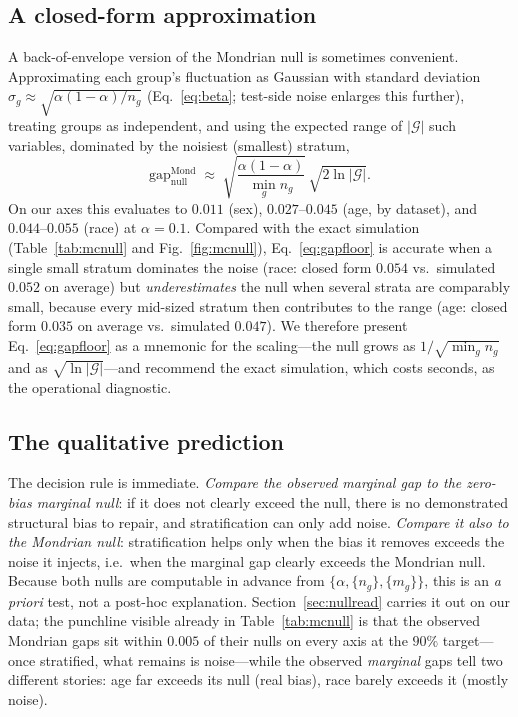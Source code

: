 \documentclass[review,12pt]{elsarticle}
\begin{document}
\subsection{A closed-form approximation}
\label{sec:floor}
A back-of-envelope version of the Mondrian null is sometimes convenient. Approximating each group's fluctuation as Gaussian with standard deviation $\sigma_g \approx \sqrt{\alpha(1-\alpha)/n_g}$ (Eq.~\eqref{eq:beta}; test-side noise enlarges this further), treating groups as independent, and using the expected range of $|\mathcal{G}|$ such variables, dominated by the noisiest (smallest) stratum,
\begin{equation}
\mathrm{gap}^{\mathrm{Mond}}_{\mathrm{null}} \;\approx\; \sqrt{\frac{\alpha(1-\alpha)}{\min_g n_g}}\,\sqrt{2\ln|\mathcal{G}|}.
\label{eq:gapfloor}
\end{equation}
On our axes this evaluates to $0.011$ (sex), $0.027$--$0.045$ (age, by dataset), and $0.044$--$0.055$ (race) at $\alpha=0.1$. Compared with the exact simulation (Table~\ref{tab:mcnull} and Fig.~\ref{fig:mcnull}), Eq.~\eqref{eq:gapfloor} is accurate when a single small stratum dominates the noise (race: closed form $0.054$ vs.\ simulated $0.052$ on average) but \emph{underestimates} the null when several strata are comparably small, because every mid-sized stratum then contributes to the range (age: closed form $0.035$ on average vs.\ simulated $0.047$). We therefore present Eq.~\eqref{eq:gapfloor} as a mnemonic for the scaling---the null grows as $1/\sqrt{\min_g n_g}$ and as $\sqrt{\ln |\mathcal{G}|}$---and recommend the exact simulation, which costs seconds, as the operational diagnostic.

\subsection{The qualitative prediction}
The decision rule is immediate. \emph{Compare the observed marginal gap to the zero-bias marginal null}: if it does not clearly exceed the null, there is no demonstrated structural bias to repair, and stratification can only add noise. \emph{Compare it also to the Mondrian null}: stratification helps only when the bias it removes exceeds the noise it injects, i.e.\ when the marginal gap clearly exceeds the Mondrian null. Because both nulls are computable in advance from $\{\alpha, \{n_g\}, \{m_g\}\}$, this is an \emph{a priori} test, not a post-hoc explanation. Section~\ref{sec:nullread} carries it out on our data; the punchline visible already in Table~\ref{tab:mcnull} is that the observed Mondrian gaps sit within $0.005$ of their nulls on every axis at the $90\%$ target---once stratified, what remains is noise---while the observed \emph{marginal} gaps tell two different stories: age far exceeds its null (real bias), race barely exceeds it (mostly noise).
\end{document}

